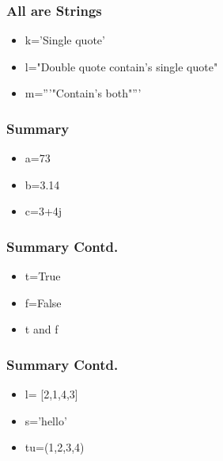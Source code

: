 \documentclass[presentation]{beamer}
\begin{document}
\begin{frame}
\frametitle{All are Strings}
\label{sec-5}
\begin{itemize}

\item k='Single quote'\\
\label{sec-5.1}%
\item l="Double quote contain's single quote"\\
\label{sec-5.2}%
\item m='''"Contain's both"'''\\
\label{sec-5.3}%
\end{itemize} %
\end{frame}
\begin{frame}
\frametitle{Summary}
\label{sec-6}
\begin{itemize}

\item a=73\\
\label{sec-6.1}%
\item b=3.14\\
\label{sec-6.2}%
\item c=3+4j\\
\label{sec-6.3}%
\end{itemize} %
\end{frame}
\begin{frame}
\frametitle{Summary Contd.}
\label{sec-7}
\begin{itemize}

\item t=True\\
\label{sec-7.1}%
\item f=False\\
\label{sec-7.2}%
\item t and f\\
\label{sec-7.3}%
\end{itemize} %
\end{frame}
\begin{frame}
\frametitle{Summary Contd.}
\label{sec-8}
\begin{itemize}

\item l= [2,1,4,3]\\
\label{sec-8.1}%
\item s='hello'\\
\label{sec-8.2}%
\item tu=(1,2,3,4)\\
\label{sec-8.3}%
\end{itemize} %
\end{frame}
\end{document}
